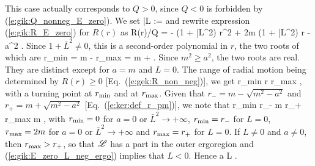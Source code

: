 This case actually corresponds to $Q > 0$, since $Q<0$ is forbidden by
(\ref{e:gik:Q_nonneg_E_zero}). We set
\be \label{e:gik:def_L_bar}
    \bar{L} := 
\ee
and rewrite expression (\ref{e:gik:R_E_zero}) for $R(r)$ as
\be \label{e:gik:R_E_zero_Lb}
    R(r)/Q  = - (1 + \bar{L}^2) r^2 + 2m (1 + \bar{L}^2) r - a^2 .
\ee
Since $1 + \bar{L}^2 \neq 0$, this is a second-order polynomial in $r$,
the two roots of which are
\be \label{e:gik:E_zero_rmin_rmax}
    r_{\rm min} = m - 
    \qand
    r_{\rm max} = m +  .
\ee
Since $m^2 \geq a^2$, the two roots are real. They are distinct
except for $a=m$ and $L=0$.
The range of radial motion being determined by $R(r)\geq 0$
[Eq.~(\ref{e:gek:R_non_neg})], we get
\be
    r_{\rm min} \leq r \leq r_{\rm max} ,
\ee
with a turning point at $r_{\rm min}$ and at $r_{\rm max}$.
Given that $r_- = m - \sqrt{m^2 - a^2}$ and $r_+ = m + \sqrt{m^2 - a^2}$
[Eq.~(\ref{e:ker:def_r_pm})], we note that
 \leq r_{\rm min} \leq r_- \leq m \leq r_+ \leq r_{\rm max}  m ,
\ee
with $r_{\rm min} = 0$ for $a = 0$ or $\bar{L}^2 \to +\infty$,
$r_{\rm min} = r_-$ for $L=0$, $r_{\rm max} = 2m$ for $a=0$
or $\bar{L}^2 \to +\infty$ and $r_{\rm max} = r_+$ for $L=0$.
If $L\neq 0$ and $a\neq 0$, then $r_{\rm max} > r_+$, so that $\mathscr{L}$ has a part in the outer
ergoregion and (\ref{e:gik:E_zero_L_neg_ergo}) implies that $L < 0$. Hence
\be \label{e:gik:E_zero_Qnz_L_neg}
    a \implies L  .
\ee


